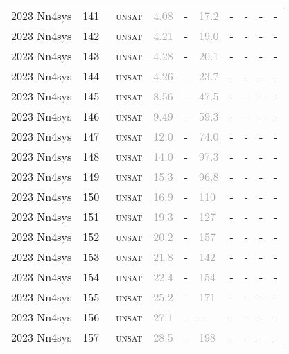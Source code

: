 \begin{center}
{\begin{longtable}{@{}llllllllll@{}}
2023 Nn4sys & 141 & ~\textsc{unsat} & \textcolor{darkgray}{4.08} & - & \textcolor{darkgray}{17.2} & - & - & - & - \\
2023 Nn4sys & 142 & ~\textsc{unsat} & \textcolor{darkgray}{4.21} & - & \textcolor{darkgray}{19.0} & - & - & - & - \\
2023 Nn4sys & 143 & ~\textsc{unsat} & \textcolor{darkgray}{4.28} & - & \textcolor{darkgray}{20.1} & - & - & - & - \\
2023 Nn4sys & 144 & ~\textsc{unsat} & \textcolor{darkgray}{4.26} & - & \textcolor{darkgray}{23.7} & - & - & - & - \\
2023 Nn4sys & 145 & ~\textsc{unsat} & \textcolor{darkgray}{8.56} & - & \textcolor{darkgray}{47.5} & - & - & - & - \\
2023 Nn4sys & 146 & ~\textsc{unsat} & \textcolor{darkgray}{9.49} & - & \textcolor{darkgray}{59.3} & - & - & - & - \\
2023 Nn4sys & 147 & ~\textsc{unsat} & \textcolor{darkgray}{12.0} & - & \textcolor{darkgray}{74.0} & - & - & - & - \\
2023 Nn4sys & 148 & ~\textsc{unsat} & \textcolor{darkgray}{14.0} & - & \textcolor{darkgray}{97.3} & - & - & - & - \\
2023 Nn4sys & 149 & ~\textsc{unsat} & \textcolor{darkgray}{15.3} & - & \textcolor{darkgray}{96.8} & - & - & - & - \\
2023 Nn4sys & 150 & ~\textsc{unsat} & \textcolor{darkgray}{16.9} & - & \textcolor{darkgray}{110} & - & - & - & - \\
2023 Nn4sys & 151 & ~\textsc{unsat} & \textcolor{darkgray}{19.3} & - & \textcolor{darkgray}{127} & - & - & - & - \\
2023 Nn4sys & 152 & ~\textsc{unsat} & \textcolor{darkgray}{20.2} & - & \textcolor{darkgray}{157} & - & - & - & - \\
2023 Nn4sys & 153 & ~\textsc{unsat} & \textcolor{darkgray}{21.8} & - & \textcolor{darkgray}{142} & - & - & - & - \\
2023 Nn4sys & 154 & ~\textsc{unsat} & \textcolor{darkgray}{22.4} & - & \textcolor{darkgray}{154} & - & - & - & - \\
2023 Nn4sys & 155 & ~\textsc{unsat} & \textcolor{darkgray}{25.2} & - & \textcolor{darkgray}{171} & - & - & - & - \\
2023 Nn4sys & 156 & ~\textsc{unsat} & \textcolor{darkgray}{27.1} & - & - & - & - & - & - \\
2023 Nn4sys & 157 & ~\textsc{unsat} & \textcolor{darkgray}{28.5} & - & \textcolor{darkgray}{198} & - & - & - & - \\

\end{longtable}}
\end{center}
